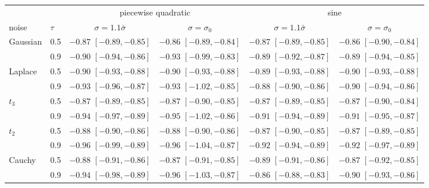 \begin{tabular}{llcccc}
\toprule
 & & \multicolumn{2}{c}{piecewise quadratic} & \multicolumn{2}{c}{sine} \\
\cmidrule(lr){3-4}\cmidrule(lr){5-6}
noise & $\tau$ & $\sigma = 1.1\bar\sigma$ & $\sigma = \sigma_0$ & $\sigma = 1.1\bar\sigma$ & $\sigma = \sigma_0$ \\
\midrule
Gaussian & 0.5 & $-0.87$ {\scriptsize $[-0.89, -0.85]$} & $-0.86$ {\scriptsize $[-0.89, -0.84]$} & $-0.87$ {\scriptsize $[-0.89, -0.85]$} & $-0.86$ {\scriptsize $[-0.90, -0.84]$} \\
 & 0.9 & $-0.90$ {\scriptsize $[-0.94, -0.86]$} & $-0.93$ {\scriptsize $[-0.99, -0.83]$} & $-0.89$ {\scriptsize $[-0.92, -0.87]$} & $-0.89$ {\scriptsize $[-0.94, -0.85]$} \\
Laplace & 0.5 & $-0.90$ {\scriptsize $[-0.93, -0.88]$} & $-0.90$ {\scriptsize $[-0.93, -0.88]$} & $-0.89$ {\scriptsize $[-0.93, -0.88]$} & $-0.90$ {\scriptsize $[-0.93, -0.88]$} \\
 & 0.9 & $-0.93$ {\scriptsize $[-0.96, -0.87]$} & $-0.93$ {\scriptsize $[-1.02, -0.85]$} & $-0.88$ {\scriptsize $[-0.90, -0.86]$} & $-0.90$ {\scriptsize $[-0.94, -0.86]$} \\
$t_3$ & 0.5 & $-0.87$ {\scriptsize $[-0.89, -0.85]$} & $-0.87$ {\scriptsize $[-0.90, -0.85]$} & $-0.87$ {\scriptsize $[-0.89, -0.85]$} & $-0.87$ {\scriptsize $[-0.90, -0.84]$} \\
 & 0.9 & $-0.94$ {\scriptsize $[-0.97, -0.89]$} & $-0.95$ {\scriptsize $[-1.02, -0.86]$} & $-0.91$ {\scriptsize $[-0.94, -0.89]$} & $-0.91$ {\scriptsize $[-0.95, -0.87]$} \\
$t_2$ & 0.5 & $-0.88$ {\scriptsize $[-0.90, -0.86]$} & $-0.88$ {\scriptsize $[-0.90, -0.86]$} & $-0.87$ {\scriptsize $[-0.90, -0.85]$} & $-0.87$ {\scriptsize $[-0.89, -0.85]$} \\
 & 0.9 & $-0.96$ {\scriptsize $[-0.99, -0.89]$} & $-0.96$ {\scriptsize $[-1.04, -0.87]$} & $-0.92$ {\scriptsize $[-0.94, -0.89]$} & $-0.92$ {\scriptsize $[-0.97, -0.89]$} \\
Cauchy & 0.5 & $-0.88$ {\scriptsize $[-0.91, -0.86]$} & $-0.87$ {\scriptsize $[-0.91, -0.85]$} & $-0.89$ {\scriptsize $[-0.91, -0.86]$} & $-0.87$ {\scriptsize $[-0.92, -0.85]$} \\
 & 0.9 & $-0.94$ {\scriptsize $[-0.98, -0.89]$} & $-0.96$ {\scriptsize $[-1.03, -0.87]$} & $-0.86$ {\scriptsize $[-0.88, -0.83]$} & $-0.90$ {\scriptsize $[-0.93, -0.86]$} \\
\bottomrule
\end{tabular}
